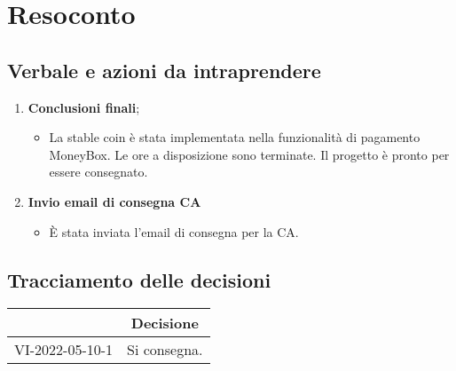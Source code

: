 \section{Resoconto}
\subsection{Verbale e azioni da intraprendere}

\begin{enumerate}
	\item \textbf{Conclusioni finali};
	\begin{itemize}
		\item La stable coin\glo{} è stata implementata nella funzionalità di pagamento MoneyBox. Le ore a disposizione sono terminate. Il progetto è pronto per essere consegnato.
	\end{itemize}
	\item \textbf{Invio email di consegna CA}
	\begin{itemize}
		\item È stata inviata l'email di consegna per la CA.
	\end{itemize}
\end{enumerate}

\pagebreak

\subsection{Tracciamento delle decisioni}

\begin{table}[H]
	\centering
	\renewcommand{\arraystretch}{1.8}
	\begin{tabular}{c | p{10cm}}
		\rowcolor[HTML]{125E28}
		\multicolumn{1}{c}{\color[HTML]{FFFFFF} \textbf{ID}} &
		\multicolumn{1}{c}{\color[HTML]{FFFFFF} \textbf{Decisione}} \\
		\hline
		VI-2022-05-10-1 & Si consegna.\\ \hline
	\end{tabular}
\end{table}
